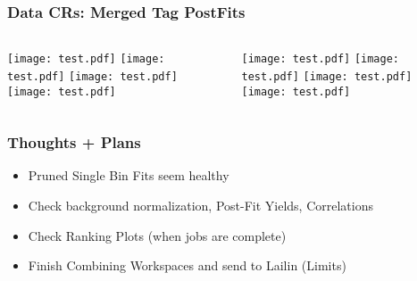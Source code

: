 \documentclass{beamer}
\begin{document}
\begin{frame}
\frametitle{Data CRs: Merged Tag PostFits}
    \begin{columns}[t]

       \texttt{[image: test.pdf]}
       \texttt{[image: test.pdf]}   
       \texttt{[image: test.pdf]}
       \texttt{[image: test.pdf]}   
       
       \texttt{[image: test.pdf]}
       \texttt{[image: test.pdf]}   
       \texttt{[image: test.pdf]}
       \texttt{[image: test.pdf]}   
\end{columns}
\end{frame}

\begin{frame}
\frametitle{Thoughts + Plans}


\begin{itemize}[label={-}]
\item Pruned Single Bin Fits seem healthy
\item Check background normalization, Post-Fit Yields, Correlations
\item Check Ranking Plots (when jobs are complete)
\item Finish Combining Workspaces and send to Lailin (Limits)
\end{itemize}
\end{frame}
\iffalse

\fi
\end{document}
